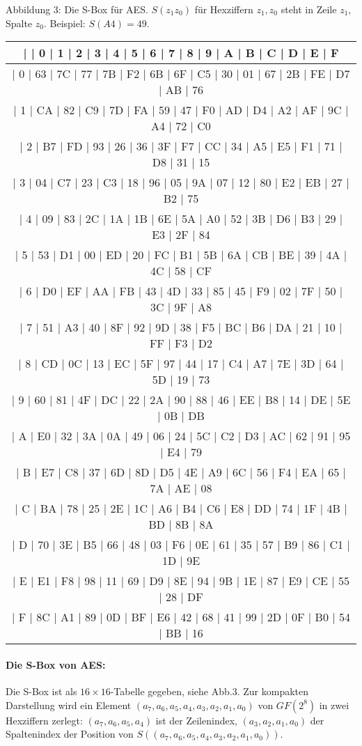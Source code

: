 \documentclass[a4paper]{article}
\begin{document}
\begin{multicols}{3}
    Abbildung 3: Die S-Box für AES. $S(z_1 z_0)$ für Hexziffern $z_1,z_0$ steht in Zeile $z_1$, Spalte $z_0$. Beispiel: $S(A4)=49$.
    \begin{tabular}{c}
        |   | 0  | 1  | 2  | 3  | 4  | 5  | 6  | 7  | 8  | 9  | A  | B  | C  | D  | E  | F   \\\hline
        | 0  | 63 | 7C | 77 | 7B | F2 | 6B | 6F | C5 | 30 | 01 | 67 | 2B | FE | D7 | AB | 76 \\
        | 1  | CA | 82 | C9 | 7D | FA | 59 | 47 | F0 | AD | D4 | A2 | AF | 9C | A4 | 72 | C0 \\
        | 2  | B7 | FD | 93 | 26 | 36 | 3F | F7 | CC | 34 | A5 | E5 | F1 | 71 | D8 | 31 | 15 \\
        | 3  | 04 | C7 | 23 | C3 | 18 | 96 | 05 | 9A | 07 | 12 | 80 | E2 | EB | 27 | B2 | 75 \\
        | 4  | 09 | 83 | 2C | 1A | 1B | 6E | 5A | A0 | 52 | 3B | D6 | B3 | 29 | E3 | 2F | 84 \\
        | 5  | 53 | D1 | 00 | ED | 20 | FC | B1 | 5B | 6A | CB | BE | 39 | 4A | 4C | 58 | CF \\
        | 6  | D0 | EF | AA | FB | 43 | 4D | 33 | 85 | 45 | F9 | 02 | 7F | 50 | 3C | 9F | A8 \\
        | 7  | 51 | A3 | 40 | 8F | 92 | 9D | 38 | F5 | BC | B6 | DA | 21 | 10 | FF | F3 | D2 \\
        | 8  | CD | 0C | 13 | EC | 5F | 97 | 44 | 17 | C4 | A7 | 7E | 3D | 64 | 5D | 19 | 73 \\
        | 9  | 60 | 81 | 4F | DC | 22 | 2A | 90 | 88 | 46 | EE | B8 | 14 | DE | 5E | 0B | DB \\
        | A  | E0 | 32 | 3A | 0A | 49 | 06 | 24 | 5C | C2 | D3 | AC | 62 | 91 | 95 | E4 | 79 \\
        | B  | E7 | C8 | 37 | 6D | 8D | D5 | 4E | A9 | 6C | 56 | F4 | EA | 65 | 7A | AE | 08 \\
        | C  | BA | 78 | 25 | 2E | 1C | A6 | B4 | C6 | E8 | DD | 74 | 1F | 4B | BD | 8B | 8A \\
        | D  | 70 | 3E | B5 | 66 | 48 | 03 | F6 | 0E | 61 | 35 | 57 | B9 | 86 | C1 | 1D | 9E \\
        | E  | E1 | F8 | 98 | 11 | 69 | D9 | 8E | 94 | 9B | 1E | 87 | E9 | CE | 55 | 28 | DF \\
        | F  | 8C | A1 | 89 | 0D | BF | E6 | 42 | 68 | 41 | 99 | 2D | 0F | B0 | 54 | BB | 16
    \end{tabular}

    \paragraph{Die S-Box von AES:}
    Die S-Box ist als $16\times 16$-Tabelle gegeben, siehe Abb.3. Zur kompakten Darstellung wird ein Element $(a_7,a_6,a_5,a_4,a_3,a_2,a_1,a_0)$ von $GF(2^8)$ in zwei Hexziffern zerlegt: $(a_7,a_6,a_5,a_4)$ ist der Zeilenindex, $(a_3,a_2,a_1,a_0)$ der Spaltenindex der Position von $S((a_7,a_6,a_5,a_4,a_3,a_2,a_1,a_0))$.


\end{multicols}
\end{document}
